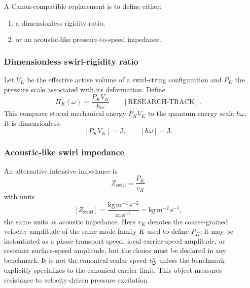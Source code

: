         A Canon-compatible replacement is to define either:
        
        \begin{enumerate}
            \item a dimensionless rigidity ratio,
            \item or an acoustic-like pressure-to-speed impedance.
        \end{enumerate}
    
    \subsubsection*{Dimensionless swirl-rigidity ratio}
        
        Let \(V_K\) be the effective active volume of a swirl-string configuration and \(P_K\) the pressure scale associated with its deformation. Define
        \begin{equation}
            \boxed{
                \Pi_K(\omega)
                =
                \frac{P_K V_K}{\hbar\omega}
            }
            \qquad
            [\mathrm{RESEARCH\text{-}TRACK}].
            \label{eq:dimensionless_swirl_rigidity}
        \end{equation}
        This compares stored mechanical energy \(P_KV_K\) to the quantum energy scale \(\hbar\omega\). It is dimensionless:
        \[
            [P_KV_K]=\mathrm{J},
            \qquad
            [\hbar\omega]=\mathrm{J}.
        \]
    
    \subsubsection*{Acoustic-like swirl impedance}
        
        An alternative intensive impedance is
        \begin{equation}
            \boxed{
                Z_{\mathrm{swirl}}
                =
                \frac{P_K}{v_K}
            }
            \label{eq:swirl_acoustic_impedance}
        \end{equation}
        with units
        \[
            [Z_{\mathrm{swirl}}]
            =
            \frac{\mathrm{kg\,m^{-1}\,s^{-2}}}{\mathrm{m\,s^{-1}}}
            =
            \mathrm{kg\,m^{-2}\,s^{-1}},
        \]
        the same units as acoustic impedance. Here $v_K$ denotes the coarse-grained velocity amplitude of the same mode family $K$ used to define $P_K$; it may be instantiated as a phase-transport speed, local carrier-speed amplitude, or resonant surface-speed amplitude, but the choice must be declared in any benchmark. It is not the canonical scalar speed $v_{\!\boldsymbol{\circlearrowleft}}^{\ast}$ unless the benchmark explicitly specializes to the canonical carrier limit. This object measures resistance to velocity-driven pressure excitation.
    
